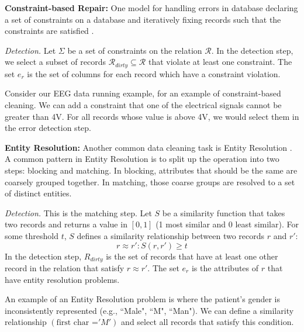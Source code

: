 \noindent\textbf{Constraint-based Repair: }
One model for handling errors in database declaring a set of constraints on a database and 
iteratively fixing records such that the constraints are satisfied \cite{DBLP:journals/pvldb/YakoutENOI11, DBLP:journals/pvldb/FanLMTY10, khayyat2015bigdansing}.

\vspace{0.5em}

\emph{Detection. } Let $\Sigma$ be a set of constraints on the relation $\mathcal{R}$. 
In the detection step, we select a subset of records $\mathcal{R}_{dirty} \subseteq \mathcal{R}$ that violate at least one constraint.
The set $e_r$ is the set of columns for each record which have a constraint violation. 

\begin{example}
Consider our EEG data running example, for an example of constraint-based cleaning.
We can add a constraint that one of the electrical signals cannot be greater than 4V.
For all records whose value is above 4V, we would select them in the error detection step.
\end{example}

\vspace{0.5em}

\noindent\textbf{Entity Resolution: }
Another common data cleaning task is Entity Resolution \cite{gokhale2014corleone, DBLP:journals/pvldb/KopckeTR10, wang2012crowder}.
A common pattern in Entity Resolution is to split up the operation into two steps: blocking and matching.
In blocking, attributes that should be the same are coarsely grouped together.
In matching, those coarse groups are resolved to a set of distinct entities.

\vspace{0.5em}

\emph{Detection. } This is the matching step. Let $S$ be a similarity function that takes two records and returns a value in $[0,1]$ (1 most similar and 0 least similar). For some threshold $t$, $S$ defines a similarity relationship between two records $r$ and $r'$:
\[
r \approx r' : S(r,r') \ge t
\] 
In the detection step, $R_{dirty}$ is the set of records that have at least one other record in the relation that satisfy $r \approx r'$.
The set $e_r$ is the attributes of $r$ that have entity resolution problems.

\begin{example}
An example of an Entity Resolution problem is where the patient's gender is inconsistently represented (e.g., ``Male", ``M", ``Man"). 
We can define a similarity relationship $(\text{first char =} 'M')$ and select all records that satisfy this condition.
\end{example}

